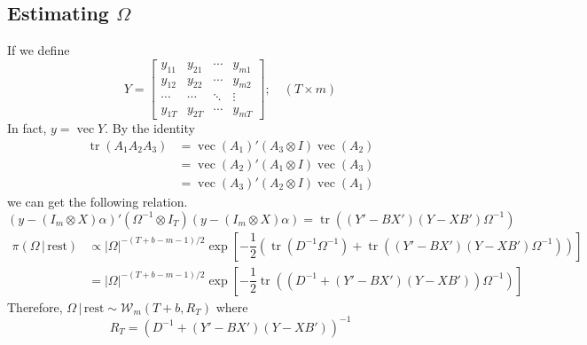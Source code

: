 \documentclass{article}
\DeclareMathOperator{\tr}{tr}
\DeclareMathOperator{\ve}{vec}
\begin{document}
\subsection{Estimating $\Omega$}
If we define
\begin{equation}
  Y = \begin{bmatrix} y_{11} & y_{21} & \cdots & y_{m1}\\ y_{12} & y_{22}& \cdots & y_{m2} \\ \cdots & \cdots & \ddots & \vdots \\ y_{1T} & y_{2T} & \cdots & y_{mT}\end{bmatrix}; \quad (T\times m)
\end{equation}
In fact, $ y = \ve Y$. By the identity
\begin{align}
  \tr(A_{1}A_{2}A_{3}) &= \ve (A_{1})'(A_{3}\otimes I)\ve (A_{2})\\
  &= \ve (A_{2})'(A_{1}\otimes I)\ve (A_{3})\\
  &= \ve(A_{3})'(A_{2}\otimes I)\ve(A_{1})
\end{align}
we can get the following relation.
\begin{equation}
  \left(y-\left(I_{m}\otimes X\right)\alpha\right)'\left(\Omega^{-1}\otimes I_{T}\right)\left(y-\left(I_{m}\otimes X\right)\alpha\right) = \tr\left(\left(Y'-BX'\right)\left(Y-XB'\right)\Omega^{-1}\right)
\end{equation}
\begin{align}
  \pi(\Omega\,|\,\text{rest}) &\propto |\Omega|^{-(T+b-m-1)/2}\exp\left[-\dfrac{1}{2}\left(\tr\left(D^{-1}\Omega^{-1}\right)+\tr\left((Y'-BX')(Y-XB')\Omega^{-1}\right)\right)\right]\\
  &= |\Omega|^{-(T+b-m-1)/2}\exp\left[-\dfrac{1}{2}\tr\left(\left(D^{-1}+\left(Y'-BX'\right)\left(Y-XB'\right) \right)\Omega^{-1}\right)\right]
\end{align}
Therefore, $\Omega\,|\,\text{rest} \sim \mathcal{W}_{m}\left(T+b,R_{T}\right)$ where
\begin{equation}
 R_{T} = \left(D^{-1}+\left(Y'-BX'\right)\left(Y-XB'\right) \right)^{-1}
\end{equation}
\end{document}
